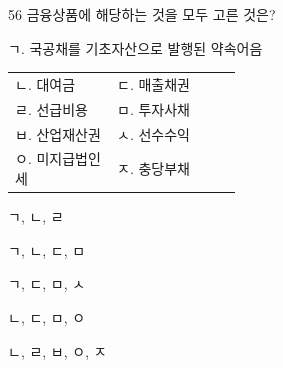 \begin{question}{56}
금융상품에 해당하는 것을 모두 고른 것은?
\begin{framedtext}
ㄱ. 국공채를 기초자산으로 발행된 약속어음 \par
\begin{tabular}{@{}p{0.45\linewidth}l@{}}
ㄴ. 대여금 & ㄷ. 매출채권 \\
ㄹ. 선급비용 & ㅁ. 투자사채 \\
ㅂ. 산업재산권 & ㅅ. 선수수익 \\
ㅇ. 미지급법인세 & ㅈ. 충당부채
\end{tabular}
\end{framedtext}
\begin{choices}
  \item ㄱ, ㄴ, ㄹ
  \item ㄱ, ㄴ, ㄷ, ㅁ
  \item ㄱ, ㄷ, ㅁ, ㅅ
  \item ㄴ, ㄷ, ㅁ, ㅇ
  \item ㄴ, ㄹ, ㅂ, ㅇ, ㅈ
\end{choices}
\end{question}
